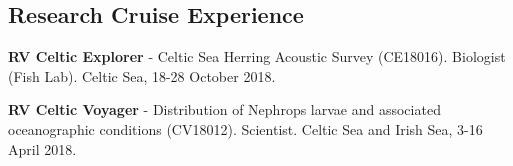 \documentclass[a4paper]{deedy-resume} %
\begin{document}
\begin{flushleft}
\sectionspace %



\section{Research Cruise Experience}
\sectionspace

\begin{tightitemize}
\item \textbf{RV Celtic Explorer} - Celtic Sea Herring Acoustic Survey (CE18016). Biologist (Fish Lab). Celtic Sea, 18-28 October 2018. 
\item \textbf{RV Celtic Voyager} - Distribution of Nephrops larvae and associated oceanographic conditions (CV18012). Scientist. Celtic Sea and Irish Sea, 3-16 April 2018.
\end{tightitemize}

\sectionspace %

\end{flushleft}
\end{document}
